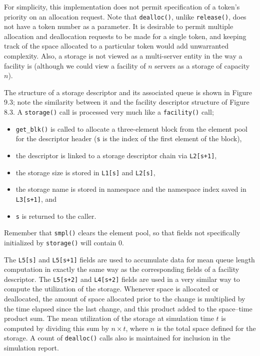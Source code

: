 For simplicity, this implementation does not permit specification of a
token's priority on an allocation request. Note that \texttt{dealloc()}, unlike
\texttt{release()}, does not have a token number as a parameter. It is desirable to
permit multiple allocation and deallocation requests to be made for a single
token, and keeping track of the space allocated to a particular token would
\noindent add unwarranted complexity. Also, a storage is not viewed as a multi-server
entity in the way a facility is (although we could view a facility of $n$ servers
as a storage of capacity $n$).

The structure of a storage descriptor and its associated queue is shown in
Figure 9.3; note the similarity between it and the facility descriptor structure
of Figure 8.3. A \texttt{storage()} call is processed very much like a
\texttt{facility()} call;
\begin{itemize}
\item \texttt{get\_blk()} is called to allocate a three-element block
from the element pool for the descriptor header (\texttt{s} is the
index of the first element of the block),
\item the descriptor is linked to a storage descriptor chain via
\texttt{L2[s+1]},
\item the storage size is stored in \texttt{L1[s]} and \texttt{L2[s]},
\item the storage name is stored in namespace and the namespace index saved in \texttt{L3[s+1]}, and
\item \texttt{s} is returned to the caller.
\end{itemize}
Remember that \texttt{smpl()} clears the element pool, so that fields not
specifically initialized by \texttt{storage()} will contain 0.

The \texttt{L5[s]} and \texttt{L5[s+1]} fields are used to accumulate data for mean
queue length computation in exactly the same way as the corresponding
fields of a facility descriptor. The \texttt{L5[s+2]} and \texttt{L4[s+2]} fields are used in a
very similar way to compute the utilization of the storage. Whenever space
is allocated or deallocated, the amount of space allocated prior to the
change is multiplied by the time elapsed since the last change, and this
product added to the space--time product sum. The mean utilization of the
storage at simulation time $t$ is computed by dividing this sum by $n\times t$, where
$n$ is the total space defined for the storage. A count of \texttt{dealloc()} calls also
is maintained for inclusion in the simulation report.

